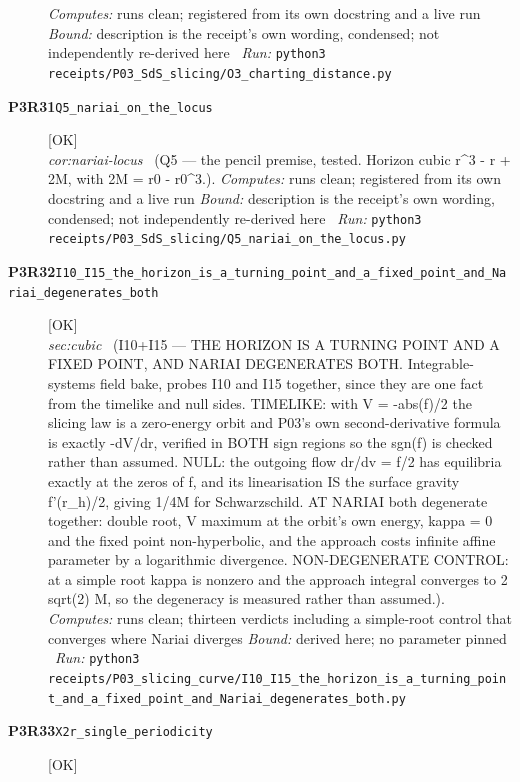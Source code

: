 \begin{description}
\emph{Computes:} runs clean; registered from its own docstring and a live run
 \emph{Bound:} description is the receipt's own wording, condensed; not independently re-derived here
\ \emph{Run:} \texttt{python3 receipts/P03\_SdS\_slicing/O3\_charting\_distance.py}
\item[\rcptlabel{Q5_nariai_on_the_locus}{P3R31}\textbf{P3R31}\quad\texttt{Q5\_nariai\_on\_the\_locus}]\hfill\textsf{[OK]}\\
\textit{cor:nariai-locus} \ (Q5 --- the pencil premise, tested. Horizon cubic r\textasciicircum{}3 - r + 2M, with 2M = r0 - r0\textasciicircum{}3.). 
\emph{Computes:} runs clean; registered from its own docstring and a live run
 \emph{Bound:} description is the receipt's own wording, condensed; not independently re-derived here
\ \emph{Run:} \texttt{python3 receipts/P03\_SdS\_slicing/Q5\_nariai\_on\_the\_locus.py}
\item[\rcptlabel{I10_I15_the_horizon_is_a_turning_point_and_a_fixed_point_and_Nariai_degenerates_both}{P3R32}\textbf{P3R32}\quad\texttt{I10\_I15\_the\_horizon\_is\_a\_turning\_point\_and\_a\_fixed\_point\_and\_Nariai\_degenerates\_both}]\hfill\textsf{[OK]}\\
\textit{sec:cubic} \ (I10+I15 --- THE HORIZON IS A TURNING POINT AND A FIXED POINT, AND NARIAI DEGENERATES BOTH. Integrable-systems field bake, probes I10 and I15 together, since they are one fact from the timelike and null sides. TIMELIKE: with V = -abs(f)/2 the slicing law is a zero-energy orbit and P03's own second-derivative formula is exactly -dV/dr, verified in BOTH sign regions so the sgn(f) is checked rather than assumed. NULL: the outgoing flow dr/dv = f/2 has equilibria exactly at the zeros of f, and its linearisation IS the surface gravity f'(r\_h)/2, giving 1/4M for Schwarzschild. AT NARIAI both degenerate together: double root, V maximum at the orbit's own energy, kappa = 0 and the fixed point non-hyperbolic, and the approach costs infinite affine parameter by a logarithmic divergence. NON-DEGENERATE CONTROL: at a simple root kappa is nonzero and the approach integral converges to 2 sqrt(2) M, so the degeneracy is measured rather than assumed.). 
\emph{Computes:} runs clean; thirteen verdicts including a simple-root control that converges where Nariai diverges
 \emph{Bound:} derived here; no parameter pinned
\ \emph{Run:} \texttt{python3 receipts/P03\_slicing\_curve/I10\_I15\_the\_horizon\_is\_a\_turning\_point\_and\_a\_fixed\_point\_and\_Nariai\_degenerates\_both.py}
\item[\rcptlabel{X2r_single_periodicity}{P3R33}\textbf{P3R33}\quad\texttt{X2r\_single\_periodicity}]\hfill\textsf{[OK]}\\

\end{description}
